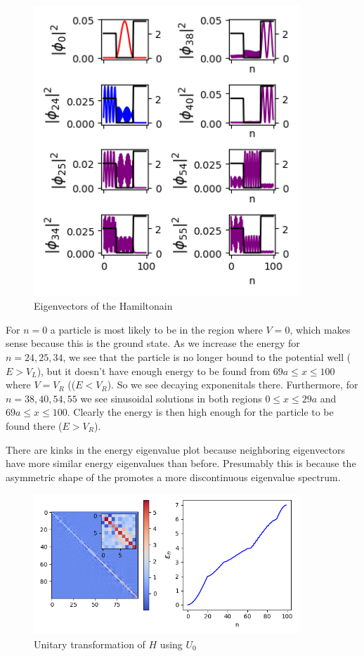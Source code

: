 \documentclass[%
 reprint,
 amsmath,amssymb,
 aps,
]{revtex4-2}
\begin{document}
\begin{figure}[t!]
\centering
\includegraphics[width=10cm]{p1_6}
\caption{Eigenvectors of the Hamiltonain}
\label{fig:method}
\end{figure}

For $n=0$ a particle is most likely to be in the region where $V=0$, which makes sense because this is the ground state. As we increase the energy for $n=24,25,34$, we see that the particle is no longer bound to the potential well ($E > V_{L}$), but it doesn't have enough energy to be found from $69a\leq x \leq 100$ where $V=V_{R}$ (($E < V_{R}$). So we see decaying exponenitals there. Furthermore, for $n=38,40,54,55$ we see sinusoidal solutions in both regions $0 \leq x \leq 29a$ and $69a\leq x \leq 100$. Clearly the energy is then high enough for the particle to be found there ($E > V_{R}$).

There are kinks in the energy eigenvalue plot because neighboring eigenvectors have more similar energy eigenvalues than before. Presumably this is because the asymmetric shape of the promotes a more discontinuous eigenvalue spectrum.


\begin{figure}[t!]
\centering
\includegraphics[width=10cm]{p1_7}
\caption{Unitary transformation of $H$ using $U_{0}$}
\label{fig:method}
\end{figure}
\end{document}
